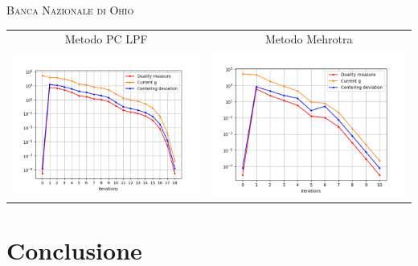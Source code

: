 \begin{frame}{\textsc{\LARGE \textcolor{iris}{Banca Nazionale di Ohio}}}
	\centering
	\begin{tabular}{c@{}c}
		\small{Metodo PC LPF} & \small{Metodo Mehrotra} \\
		\includegraphics[scale = 0.33]{onb_PCLPF}
		&\includegraphics[scale = 0.33]{onb_MER}\\ 
	\end{tabular}
\end{frame}


\section{Conclusione}

